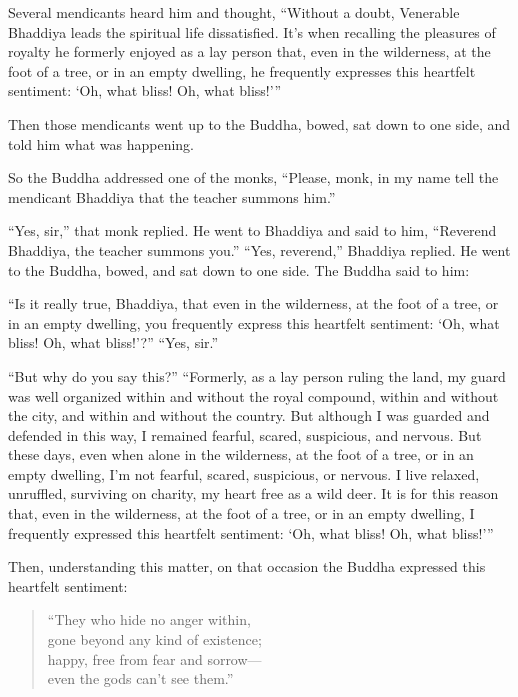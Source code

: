 \documentclass[12pt,openany]{book}%
\begin{document}
Several mendicants heard him and thought, “Without a doubt, Venerable Bhaddiya leads the spiritual life dissatisfied. It’s when recalling the pleasures of royalty he formerly enjoyed as a lay person that, even in the wilderness, at the foot of a tree, or in an empty dwelling, he frequently expresses this heartfelt sentiment: ‘Oh, what bliss! Oh, what bliss!’” 

Then those mendicants went up to the Buddha, bowed, sat down to one side, and told him what was happening. 

So the Buddha addressed one of the monks, “Please, monk, in my name tell the mendicant Bhaddiya that the teacher summons him.” 

“Yes, sir,” that monk replied. He went to Bhaddiya and said to him, “Reverend Bhaddiya, the teacher summons you.” “Yes, reverend,” Bhaddiya replied. He went to the Buddha, bowed, and sat down to one side. The Buddha said to him: 

“Is it really true, Bhaddiya, that even in the wilderness, at the foot of a tree, or in an empty dwelling, you frequently express this heartfelt sentiment: ‘Oh, what bliss! Oh, what bliss!’?” “Yes, sir.” 

“But why do you say this?” “Formerly, as a lay person ruling the land, my guard was well organized within and without the royal compound, within and without the city, and within and without the country. But although I was guarded and defended in this way, I remained fearful, scared, suspicious, and nervous. But these days, even when alone in the wilderness, at the foot of a tree, or in an empty dwelling, I’m not fearful, scared, suspicious, or nervous. I live relaxed, unruffled, surviving on charity, my heart free as a wild deer. It is for this reason that, even in the wilderness, at the foot of a tree, or in an empty dwelling, I frequently expressed this heartfelt sentiment: ‘Oh, what bliss! Oh, what bliss!’” 

Then, understanding this matter, on that occasion the Buddha expressed this heartfelt sentiment: 

\begin{verse}%
“They who hide no anger within, \\
gone beyond any kind of existence; \\
happy, free from fear and sorrow—\\
even the gods can’t see them.” 

%
\end{verse}
\end{document}

